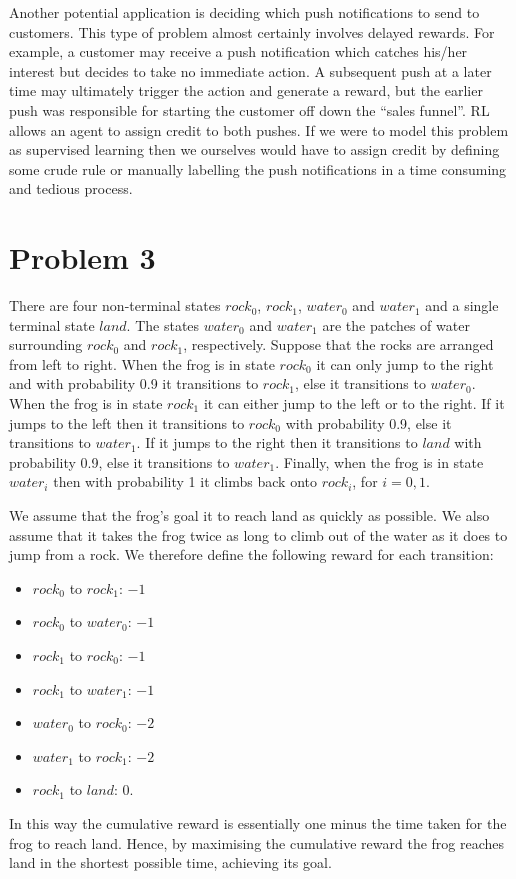 \documentclass[a4paper,11pt]{article}
\numberwithin{equation}{section}
\theoremstyle{remark}
\begin{document}
Another potential application is deciding which push notifications to send to customers. This type of problem almost certainly involves delayed rewards. For example, a customer may receive a push notification which catches his/her interest but decides to take no immediate action. A subsequent push at a later time may ultimately trigger the action and generate a reward, but the earlier push was responsible for starting the customer off down the ``sales funnel''. RL allows an agent to assign credit to both pushes. If we were to model this problem as supervised learning then we ourselves would have to assign credit by defining some crude rule or manually labelling the push notifications in a time consuming and tedious process. 

\section*{Problem 3}

There are four non-terminal states $rock_0$, $rock_1$, $water_0$ and $water_1$ and a single terminal state $land$. The states $water_0$ and $water_1$ are the patches of water surrounding $rock_0$ and $rock_1$, respectively. Suppose that the rocks are arranged from left to right.
When the frog is in state $rock_0$ it can only jump to the right and with probability 0.9 it transitions to $rock_1$, else it transitions to $water_0$. When the frog is in state $rock_1$ it can either jump to the left or to the right. If it jumps to the left then it transitions to $rock_0$ with probability 0.9, else it transitions to $water_1$. If it jumps to the right then it transitions to $land$ with probability 0.9, else it transitions to $water_1$. Finally, when the frog is in state $water_i$ then with probability 1 it climbs back onto $rock_i$, for $i=0,1$.

We assume that the frog's goal it to reach land as quickly as possible. We also assume that it takes the frog twice as long to climb out of the water as it does to jump from a rock. We therefore define the following reward for each transition:
\begin{itemize}
	\item $rock_0$ to $rock_1$: $-1$
	\item $rock_0$ to $water_0$: $-1$
	\item $rock_1$ to $rock_0$: $-1$
	\item $rock_1$ to $water_1$: $-1$
	\item $water_0$ to $rock_0$: $-2$
	\item $water_1$ to $rock_1$: $-2$
	\item $rock_1$ to $land$: $0$.
\end{itemize}
In this way the cumulative reward is essentially one minus the time taken for the frog to reach land. Hence, by maximising the cumulative reward the frog reaches land in the shortest possible time, achieving its goal.
\end{document}
